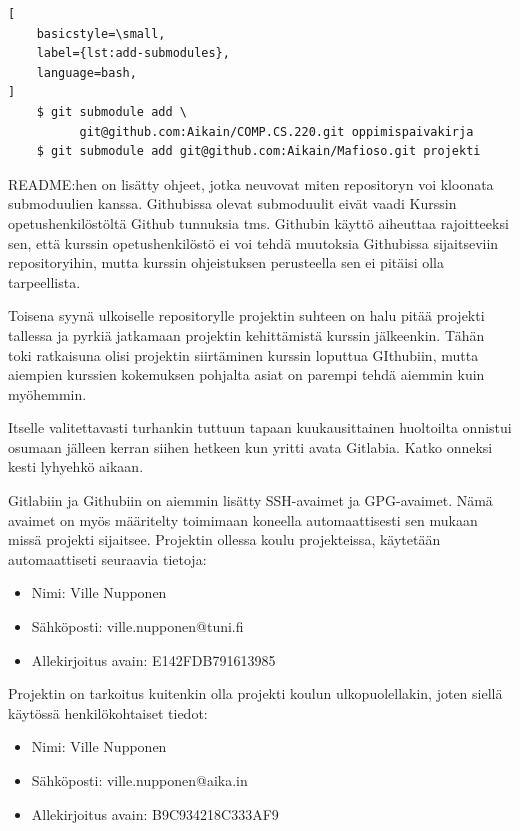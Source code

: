 \begin{lstlisting}[
    basicstyle=\small,
    label={lst:add-submodules},
    language=bash,
]
    $ git submodule add \
          git@github.com:Aikain/COMP.CS.220.git oppimispaivakirja
    $ git submodule add git@github.com:Aikain/Mafioso.git projekti
\end{lstlisting}

README:hen on lisätty ohjeet, jotka neuvovat miten repositoryn voi kloonata
submoduulien kanssa. Githubissa olevat submoduulit eivät vaadi Kurssin
opetushenkilöstöltä Github tunnuksia tms. Githubin käyttö aiheuttaa
rajoitteeksi sen, että kurssin opetushenkilöstö ei voi tehdä muutoksia
Githubissa sijaitseviin repositoryihin, mutta kurssin ohjeistuksen
perusteella sen ei pitäisi olla tarpeellista.

Toisena syynä ulkoiselle repositorylle projektin suhteen on halu pitää
projekti tallessa ja pyrkiä jatkamaan projektin kehittämistä kurssin
jälkeenkin. Tähän toki ratkaisuna olisi projektin siirtäminen kurssin
loputtua GIthubiin, mutta aiempien kurssien kokemuksen pohjalta asiat on
parempi tehdä aiemmin kuin myöhemmin.

Itselle valitettavasti turhankin tuttuun tapaan kuukausittainen huoltoilta
\parencite{TuniMaintenance2023_01} onnistui osumaan jälleen kerran siihen
hetkeen kun yritti avata Gitlabia. Katko onneksi kesti lyhyehkö aikaan.

Gitlabiin ja Githubiin on aiemmin lisätty SSH-avaimet ja GPG-avaimet. Nämä
avaimet on myös määritelty toimimaan koneella automaattisesti sen mukaan
missä projekti sijaitsee. Projektin ollessa koulu projekteissa, käytetään
automaattiseti seuraavia tietoja:
\begin{itemize}
    \item Nimi: Ville Nupponen
    \item Sähköposti: ville.nupponen@tuni.fi
    \item Allekirjoitus avain: E142FDB791613985
\end{itemize}

Projektin on tarkoitus kuitenkin olla projekti koulun ulkopuolellakin,
joten siellä käytössä henkilökohtaiset tiedot:
\begin{itemize}
    \item Nimi: Ville Nupponen
    \item Sähköposti: ville.nupponen@aika.in
    \item Allekirjoitus avain: B9C934218C333AF9
\end{itemize}

